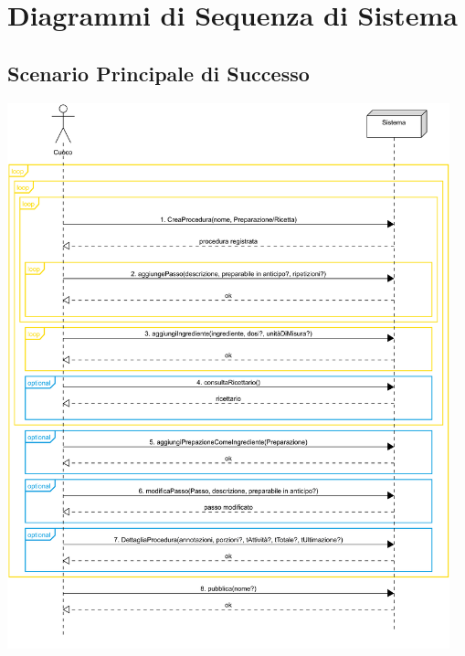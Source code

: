 \chapter{Diagrammi di Sequenza di Sistema}
\centering
\section*{Scenario Principale di Successo}
\includegraphics[max width=\textwidth, max height=158mm]{../resources/img/GRP/SSD/main.png}

